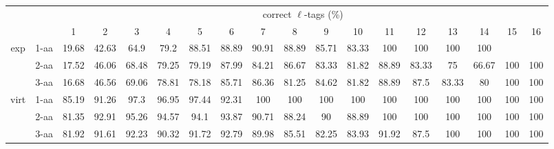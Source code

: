 \documentclass{article}[12pt]
\begin{document}
\begin{landscape}
\begin{table}[h]\tiny
\vspace{3mm}
{\centering
\begin{center}
\begin{tabular}{|c|l|c|c|c|c|c|c|c|c|c|c|c|c|c|c|c|c|}
  \hline
  \multicolumn{2}{|c|}{ } & \multicolumn{ 16 }{|c|}{ correct $\ell$-tags (\%)} \\
  \cline{3- 18}
  \multicolumn{2}{|c|}{ }  & 1 & 2 & 3 & 4 & 5 & 6 & 7 & 8 & 9 & 10 & 11 & 12 & 13 & 14 & 15 & 16\\
  \hline
  \multirow{3}{*}{exp}
&  1-aa  & 19.68 & 42.63 & 64.9 & 79.2 & 88.51 & 88.89 & 90.91 & 88.89 & 85.71 & 83.33 & 100 & 100 & 100 & 100 &  & \\
&  2-aa  & 17.52 & 46.06 & 68.48 & 79.25 & 79.19 & 87.99 & 84.21 & 86.67 & 83.33 & 81.82 & 88.89 & 83.33 & 75 & 66.67 & 100 & 100\\
&  3-aa  & 16.68 & 46.56 & 69.06 & 78.81 & 78.18 & 85.71 & 86.36 & 81.25 & 84.62 & 81.82 & 88.89 & 87.5 & 83.33 & 80 & 100 & 100\\
 \hline
  \multirow{3}{*}{virt} 
&  1-aa  & 85.19 & 91.26 & 97.3 & 96.95 & 97.44 & 92.31 & 100 & 100 & 100 & 100 & 100 & 100 & 100 & 100 & 100 & 100\\
&  2-aa  & 81.35 & 92.91 & 95.26 & 94.57 & 94.1 & 93.87 & 90.71 & 88.24 & 90 & 88.89 & 100 & 100 & 100 & 100 & 100 & 100\\
&  3-aa  & 81.92 & 91.61 & 92.23 & 90.32 & 91.72 & 92.79 & 89.98 & 85.51 & 82.25 & 83.93 & 91.92 & 87.5 & 100 & 100 & 100 & 100\\
 \hline
\end{tabular}
\end{center}
\par}
\centering
\vspace{3mm}
\end{table}


\end{landscape}
\end{document}
